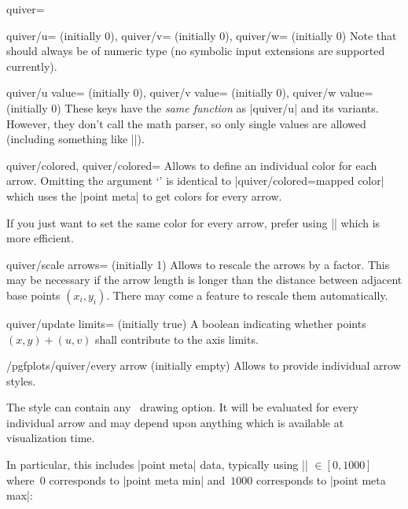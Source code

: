 {\begin{plottype}[/pgfplots]{quiver=\textcolor{black}{}}
\begin{pgfplotskeylist}{%
		quiver/u= (initially 0),
		quiver/v= (initially 0),
		quiver/w= (initially 0)}
		Note that  should always be of numeric type (no symbolic input extensions are supported currently).
	\end{pgfplotskeylist}
	\begin{pgfplotskeylist}{%
		quiver/u value= (initially 0),
		quiver/v value= (initially 0),
		quiver/w value= (initially 0)}
		These keys have the \emph{same function} as |quiver/u| and its variants. However, they don't call the math parser, so only single values are allowed (including something like ||).
	\end{pgfplotskeylist}

	\begin{pgfplotskeylist}{%
		quiver/colored,
		quiver/colored=}
		Allows to define an individual color for each arrow. Omitting the argument `' is identical to |quiver/colored=mapped color| which uses the |point meta| to get colors for every arrow.

		If you just want to set the same color for every arrow, prefer using || which is more efficient.		
	\end{pgfplotskeylist}

	\begin{pgfplotskey}{quiver/scale arrows= (initially 1)}
		Allows to rescale the arrows by a factor. This may be necessary if the arrow length is longer than the distance between adjacent base points $(x_i,y_i)$. There may come a feature to rescale them automatically.
	\end{pgfplotskey}

	\begin{pgfplotskey}{quiver/update limits= (initially true)}
		A boolean indicating whether points $(x,y)  + (u,v)$ shall contribute to the axis limits.		
	\end{pgfplotskey}

	\begin{stylekey}{/pgfplots/quiver/every arrow (initially empty)}
		Allows to provide individual arrow styles.

		The style can contain any \Tikz\ drawing option. It will be evaluated for every individual arrow and may depend upon anything which is available at visualization time. 
		
		In particular, this includes |point meta| data, typically using |\pgfplotspointmetatransformed| $\in [0,1000]$ where~$0$ corresponds to |point meta min| and~$1000$ corresponds to |point meta max|:
\begin{codeexample}[]
\end{codeexample}
\end{stylekey}
\end{plottype}}
